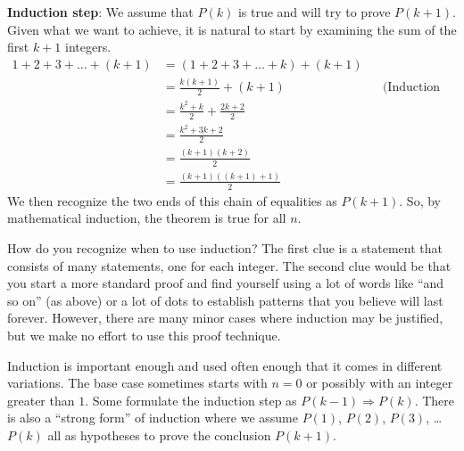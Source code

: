 \textbf{Induction step}: We assume that $P(k)$ is true and will try to prove $P(k+1)$. Given what we want to achieve, it is natural to start by examining the sum of the first $k+1$ integers.
%
\begin{align*}
1+2+3+\dots+(k+1)
%
&=\left(1+2+3+\dots+k\right) + (k+1)\\
%
&=\frac{k(k+1)}{2} + (k+1)&&\text{(Induction hypothesis.)}\\
%
&=\frac{k^2+k}{2} + \frac{2k+2}{2}\\
%
&=\frac{k^2+3k+2}{2}\\
%
&=\frac{(k+1)(k+2)}{2}\\
%
&=\frac{(k+1)((k+1)+1)}{2}
%
\end{align*}
%
We then recognize the two ends of this chain of equalities as $P(k+1)$. So, by mathematical induction, the theorem is true for all $n$.

%
How do you recognize when to use induction? The first clue is a statement that consists of many statements, one for each integer. The second clue would be that you start a more standard proof and find yourself using a lot of words like ``and so on'' (as above) or a lot of dots to establish patterns that you believe will last forever. However, there are many minor cases where induction may be justified, but we make no effort to use this proof technique.

%
Induction is important enough and used often enough that it comes in different variations. The base case sometimes starts with $n=0$ or possibly with an integer greater than $1$. Some formulate the induction step as $P(k-1)\Rightarrow P(k)$. There is also a ``strong form'' of induction where we assume $P(1)$, $P(2)$, $P(3)$, \dots $P(k)$ all as hypotheses to prove the conclusion $P(k+1)$.
\fi